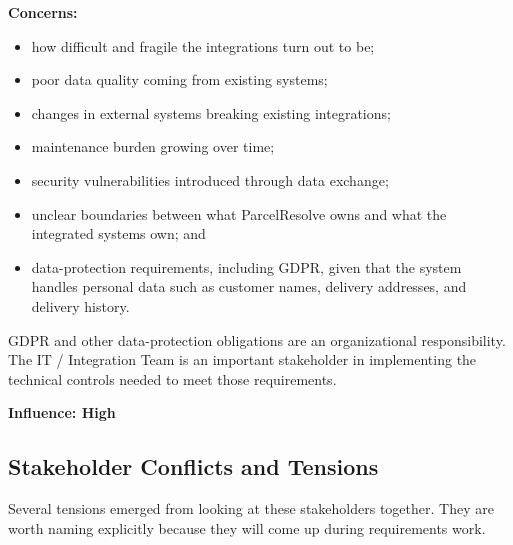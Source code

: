 \documentclass[11pt,a4paper]{article}
\begin{document}
\textbf{Concerns:}

\begin{itemize}
    \item how difficult and fragile the integrations turn out to be;
    \item poor data quality coming from existing systems;
    \item changes in external systems breaking existing integrations;
    \item maintenance burden growing over time;
    \item security vulnerabilities introduced through data exchange;
    \item unclear boundaries between what ParcelResolve owns and
    what the integrated systems own; and
    \item data-protection requirements, including GDPR, given that
    the system handles personal data such as customer names,
    delivery addresses, and delivery history.
\end{itemize}

GDPR and other data-protection obligations are an organizational
responsibility. The IT / Integration Team is an important stakeholder
in implementing the technical controls needed to meet those
requirements.

\textbf{Influence: High}


\subsection{Stakeholder Conflicts and Tensions}

Several tensions emerged from looking at these stakeholders together.
They are worth naming explicitly because they will come up during
requirements work.
\end{document}
